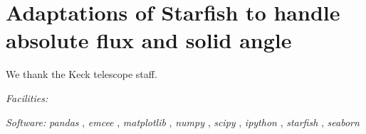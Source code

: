 \documentclass[twocolumn]{emulateapj}%
\newcommand{\project}[1]{\textsl{#1}}
\begin{document}
\appendix

\section{Adaptations of Starfish to handle absolute flux and solid angle}

\acknowledgements
We thank the Keck telescope staff. 

{\it Facilities:} 

{\it Software: } 
 \project{pandas} \citep{mckinney10},
 \project{emcee} \citep{foreman13},
 \project{matplotlib} \citep{hunter07},
 \project{numpy} \citep{vanderwalt11},
 \project{scipy} \citep{jones01},
 \project{ipython} \citep{perez07},
 \project{starfish} \citep{czekala15},
 \project{seaborn} \citep{waskom14}

\clearpage



\end{document}

